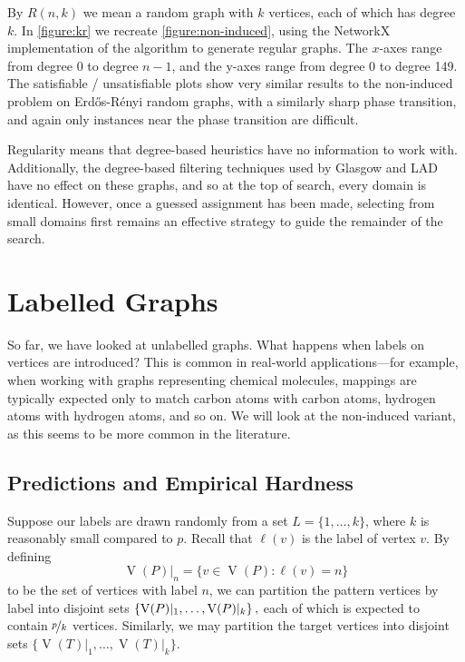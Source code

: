 \documentclass[twoside,11pt]{article}
\newcommand{\citet}[1]{\citeA{#1}}
\newcommand{\citep}[1]{\cite{#1}}
\begin{document}
By $R(n, k)$ we mean a random graph with $k$ vertices, each of which has degree $k$. In
\cref{figure:kr} we recreate \cref{figure:non-induced}, using the NetworkX implementation
\citep{o:NetworkX} of the \citet{DBLP:journals/cpc/StegerW99} algorithm to generate regular graphs.
The $x$-axes range from degree 0 to degree $n - 1$, and the y-axes range from degree 0 to degree
149.  The satisfiable / unsatisfiable plots show very similar results to the non-induced problem on
Erd\H{o}s-R\'enyi random graphs, with a similarly sharp phase transition, and
again only instances near the phase transition are difficult.

Regularity means that degree-based heuristics have no information to work with. Additionally, the
degree-based filtering techniques used by Glasgow and LAD have no effect on these graphs, and so at
the top of search, every domain is identical. However, once a guessed assignment has been made,
selecting from small domains first remains an effective strategy to guide the remainder of the
search.

\section{Labelled Graphs}\label{section:labelled}

So far, we have looked at unlabelled graphs. What happens when labels on vertices are introduced?
This is common in real-world applications---for example, when working with graphs representing
chemical molecules, mappings are typically expected only to match carbon atoms with carbon atoms,
hydrogen atoms with hydrogen atoms, and so on.  We will look at the non-induced variant, as this
seems to be more common in the literature.

\subsection{Predictions and Empirical Hardness}

Suppose our labels are drawn randomly from a set $L = \{ 1, \ldots, k \}$, where $k$ is reasonably
small compared to $p$. Recall that $\ell(v)$ is the label of vertex $v$. By defining \[
    \operatorname{V}(P)\vert_n = \{ v \in \operatorname{V}(P) : \ell(v) = n \} \] to be the set of
vertices with label $n$, we can partition the pattern vertices by label into disjoint sets
$\{\operatorname{V}(P)\vert_1, \ldots, \operatorname{V}(P)\vert_k \}\textnormal{\,,}$ each of
which is expected to contain $\nicefrac{p}{k}$ vertices. Similarly, we may partition the target
vertices into disjoint sets $\{ \operatorname{V}(T)\vert_1, \ldots, \operatorname{V}(T)\vert_k \}$.
\end{document}
